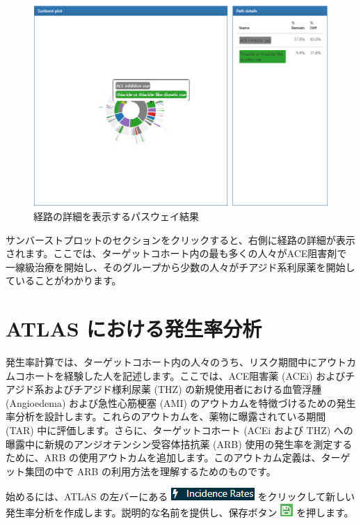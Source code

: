 \documentclass[
  11pt]{book}
\theoremstyle{definition}
\theoremstyle{definition}
\theoremstyle{definition}
\theoremstyle{definition}
\theoremstyle{remark}
\begin{document}
\begin{figure}

{\centering \includegraphics[width=1\linewidth]{images/Characterization/atlasPathwaysResultsPathDetails} 

}

\caption{経路の詳細を表示するパスウェイ結果}\label{fig:atlasPathwaysResultsPathDetails}
\end{figure}

サンバーストプロットのセクションをクリックすると、右側に経路の詳細が表示されます。ここでは、ターゲットコホート内の最も多くの人々がACE阻害剤で一線級治療を開始し、そのグループから少数の人々がチアジド系利尿薬を開始していることがわかります。

\section{ATLAS における発生率分析}\label{atlas-ux306bux304aux3051ux308bux767aux751fux7387ux5206ux6790}

発生率計算では、ターゲットコホート内の人々のうち、リスク期間中にアウトカムコホートを経験した人を記述します。ここでは、ACE阻害薬 (ACEi) およびチアジド系およびチアジド様利尿薬 (THZ) の新規使用者における血管浮腫 (Angioedema) および急性心筋梗塞 (AMI) のアウトカムを特徴づけるための発生率分析を設計します。これらのアウトカムを、薬物に曝露されている期間 (TAR) 中に評価します。さらに、ターゲットコホート (ACEi および THZ) への曝露中に新規のアンジオテンシン受容体拮抗薬 (ARB) 使用の発生率を測定するために、ARB の使用アウトカムを追加します。このアウトカム定義は、ターゲット集団の中で ARB の利用方法を理解するためのものです。

始めるには、ATLAS の左バーにある \includegraphics{images/Characterization/atlasIncidenceMenuItem.png} をクリックして新しい発生率分析を作成します。説明的な名前を提供し、保存ボタン \includegraphics{images/PopulationLevelEstimation/save.png} を押します。
\end{document}
